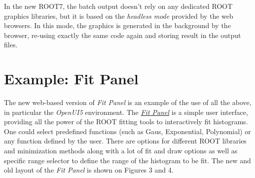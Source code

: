 \documentclass[a4paper]{jpconf}
\begin{document}
In the new ROOT7, the batch output doesn't rely on any dedicated ROOT graphics
libraries, but it is based on the \textit{headless mode} provided by the web
browsers. In this mode, the graphics is generated in the background by the browser, re-using exactly the same code again and storing result in the output files.

\section{Example: Fit Panel}

The new web-based version of \textit{Fit Panel} is an example of the use of all the above,
in particular the \textit{OpenUI5} environment.
The \href{https://root.cern/fit-panel}{\textit{Fit Panel}} is a simple user interface, providing all the
power of the ROOT fitting tools to interactively fit histograms. One could select predefined
functions (such as Gaus, Exponential, Polynomial) or any function defined by
the user. There are options for different ROOT libraries and minimization methods
along with a lot of fit and draw options as well as specific range selector to define the range of the
histogram to be fit. The new and old layout of the \textit{Fit Panel} is shown on Figures 3 and 4.
\end{document}
